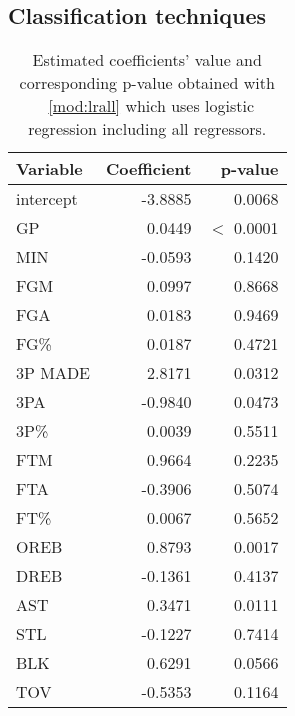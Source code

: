 \subsection*{Classification techniques}\label{appendix:ct}

\begin{center}
\end{center}

\begin{table}[H]
	\centering
	\begin{tabular}{|| l | r | r ||} 
		\hline
		Variable & Coefficient & p-value \\
		\hline
		intercept & -3.8885 & 0.0068 \\
		GP & 0.0449 & $<$ 0.0001 \\
		MIN & -0.0593 & 0.1420 \\
		FGM & 0.0997 & 0.8668 \\
		FGA & 0.0183 & 0.9469 \\
		FG\% & 0.0187 & 0.4721 \\
		3P MADE & 2.8171 & 0.0312 \\
		3PA & -0.9840 & 0.0473 \\
		3P\% & 0.0039 & 0.5511 \\
		FTM & 0.9664 & 0.2235 \\
		FTA & -0.3906 & 0.5074 \\
		FT\% & 0.0067 & 0.5652 \\
		OREB & 0.8793 & 0.0017 \\
		DREB & -0.1361 & 0.4137 \\
		AST & 0.3471 & 0.0111 \\
		STL & -0.1227 & 0.7414 \\
		BLK & 0.6291 & 0.0566 \\				
		TOV & -0.5353 & 0.1164 \\		
		\hline
	\end{tabular}
	\caption{Estimated coefficients' value and corresponding p-value obtained with \Mod~\ref{mod:lrall} which uses logistic regression including all regressors.}
	\label{table:LRAllSum}
\end{table}

